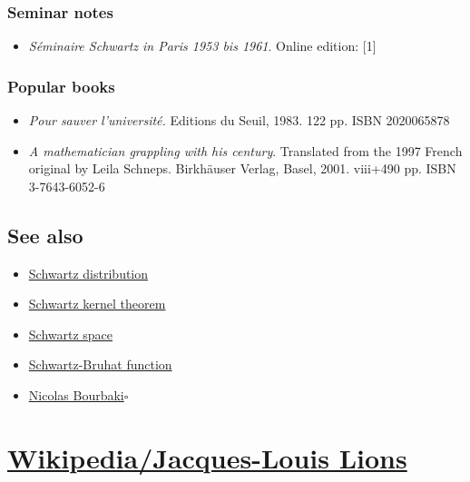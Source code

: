 \documentclass{book}
\numberwithin{equation}{section}
\begin{document}
\subsection{Seminar notes}
\begin{itemize}
    \item \textit{Séminaire Schwartz in Paris 1953 bis 1961}. Online edition: [1]
\end{itemize}

\subsection{Popular books}
\begin{itemize}
    \item \textit{Pour sauver l'université.} Editions du Seuil, 1983. 122 pp. ISBN 2020065878
    \item \textit{A mathematician grappling with his century}. Translated from the 1997 French original by Leila Schneps. Birkhäuser Verlag, Basel, 2001. viii+490 pp. ISBN 3-7643-6052-6
\end{itemize}

\section{See also}
\begin{itemize}
    \item \href{https://en.wikipedia.org/wiki/Schwartz_distribution}{Schwartz distribution}
    \item \href{https://en.wikipedia.org/wiki/Schwartz_kernel_theorem}{Schwartz kernel theorem}
    \item \href{https://en.wikipedia.org/wiki/Schwartz_space}{Schwartz space}
    \item \href{https://en.wikipedia.org/wiki/Schwartz-Bruhat_function}{Schwartz-Bruhat function}
    \item \href{https://en.wikipedia.org/wiki/Nicolas_Bourbaki}{Nicolas Bourbaki}\hfill$\square$
\end{itemize}


\chapter{\href{https://en.wikipedia.org/wiki/Jacques-Louis_Lions}{Wikipedia/Jacques-Louis Lions}}
\end{document}
